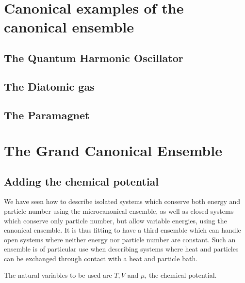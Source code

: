 \documentclass[a4paper,11pt,oneside]{book}
\begin{document}
\chapter{Canonical examples of the canonical ensemble}
\section{The Quantum Harmonic Oscillator}
\section{The Diatomic gas}
\section{The Paramagnet}
\chapter{The Grand Canonical Ensemble}
\section{Adding the chemical potential}
We have seen how to describe isolated systems which conserve both energy and particle number using the microcanonical ensemble, as well as closed systems which conserve only particle number, but allow variable energies, using the canonical ensemble. It is thus fitting to have a third ensemble which can handle open systems where neither energy nor particle number are constant. Such an ensemble is of particular use when describing systems where heat and particles can be exchanged through contact with a heat and particle bath. 

The natural variables to be used are $T,V$ and $\mu$, the chemical potential. 
\end{document}

